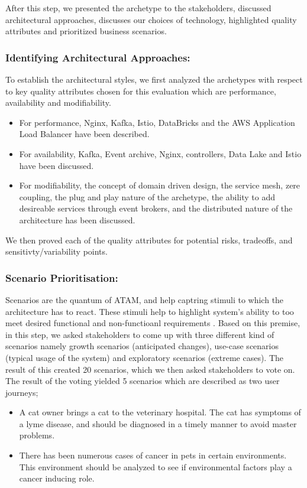 \documentclass[review]{elsarticle}
\begin{document}
After this step, we presented the archetype to the stakeholders, discussed architectural approaches, discusses our choices of technology, highlighted quality attributes and prioritized business scenarios.

\subsubsection{Identifying Architectural Approaches:} To establish the architectural styles, we first analyzed the archetypes with respect to key quality attributes chosen for this evaluation which are performance, availability and modifiability.

\begin{itemize}
    \item For performance, Nginx, Kafka, Istio, DataBricks and the AWS Application Load Balancer have been described.
    \item For availability, Kafka, Event archive, Nginx, controllers, Data Lake and Istio have been discussed.
    \item For modifiability, the concept of domain driven design, the service mesh, zere coupling, the plug and play nature of the archetype, the ability to add desireable services through event brokers, and the distributed nature of the architecture has been discussed.
\end{itemize}

We then proved each of the quality attributes for potential risks, tradeoffs, and sensitivty/variability points.

\subsubsection{Scenario Prioritisation:}

Scenarios are the quantum of ATAM, and help captring stimuli to which the architecture has to react. These stimuli help to highlight system's ability to too meet desired functional and non-functioanl requirements \cite{KazmanATAM}. Based on this premise, in this step, we asked stakeholders to come up with three different kind of scenarios namely growth scenarios (anticipated changes), use-case scenarios (typical usage of the system) and exploratory scenarios (extreme cases). The result of this created 20 scenarios, which we then asked stakeholders to vote on. The result of the voting yielded 5 scenarios which are described as two user journeys;

\begin{itemize}
    \item A cat owner brings a cat to the veterinary hospital. The cat has symptoms of a lyme disease, and should be diagnosed in a timely manner to avoid master problems.
    \item There has been numerous cases of cancer in pets in certain environments. This environment should be analyzed to see if environmental factors play a cancer inducing role.
\end{itemize}
\end{document}
